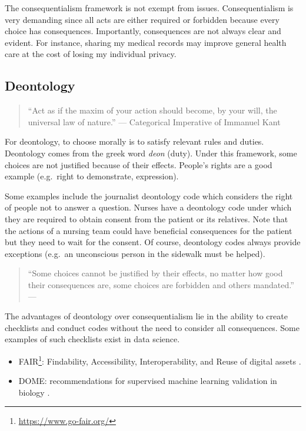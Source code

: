 \documentclass[
  12pt,
]{book}
\providecommand{\tightlist}{%
  \setlength{\itemsep}{0pt}\setlength{\parskip}{0pt}}
\DeclareRobustCommand{\href}[2]{#2\footnote{\url{#1}}}
\begin{document}
The consequentialism framework is not exempt from issues. Consequentialism is very demanding since all acts are either required or forbidden because every choice has consequences. Importantly, consequences are not always clear and evident. For instance, sharing my medical records may improve general health care at the cost of losing my individual privacy.

\subsection{Deontology}\label{deontology}

\begin{quote}
``Act as if the maxim of your action should become, by your will, the universal law of nature.'' --- Categorical Imperative of Immanuel Kant
\end{quote}

For deontology, to choose morally is to satisfy relevant rules and duties. Deontology comes from the greek word \emph{deon} (duty). Under this framework, some choices are not justified because of their effects. People's rights are a good example (e.g.~right to demonstrate, expression).

Some examples include the journalist deontology code which considers the right of people not to answer a question. Nurses have a deontology code under which they are required to obtain consent from the patient or its relatives. Note that the actions of a nursing team could have beneficial consequences for the patient but they need to wait for the consent. Of course, deontology codes always provide exceptions (e.g.~an unconscious person in the sidewalk must be helped).

\begin{quote}
``Some choices cannot be justified by their effects, no matter how good their consequences are, some choices are forbidden and others mandated.'' --- \citep{sep-ethics-deontological}
\end{quote}

The advantages of deontology over consequentialism lie in the ability to create checklists and conduct codes without the need to consider all consequences. Some examples of such checklists exist in data science.

\begin{itemize}
\tightlist
\item
  \href{https://www.go-fair.org/}{FAIR}: Findability, Accessibility, Interoperability, and Reuse of digital assets \citep{wilkinson2016fair}.
\item
  DOME: recommendations for supervised machine learning validation in biology \citep{walsh2021dome}.
\end{itemize}
\end{document}
